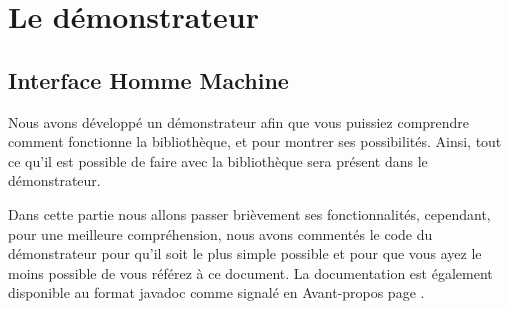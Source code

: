 \documentclass[12pt,a4paper,oneside]{book}
\begin{document}
	\maketitle
	\setcounter{tocdepth}{1}
	\setcounter{secnumdepth}{3}
	\frontmatter
	
	\tableofcontents
	\nouveauChapitre
	\newpage
	\mainmatter
	\chapter{Le démonstrateur}
	\section{Interface Homme Machine}
	\nouveauChapitre
	Nous avons développé un démonstrateur afin que vous puissiez comprendre comment fonctionne la bibliothèque, et pour montrer ses possibilités.
	Ainsi, tout ce qu'il est possible de faire avec la bibliothèque sera présent dans le démonstrateur.

	Dans cette partie nous allons passer brièvement ses fonctionnalités, cependant, pour une meilleure
	compréhension, nous avons commentés le code du démonstrateur pour qu'il soit le plus simple possible et pour que vous ayez le moins 
	possible de vous référez à ce document. La documentation est également disponible au format javadoc comme signalé en Avant-propos page \pageref{docDemonstrateur}.
\end{document}
